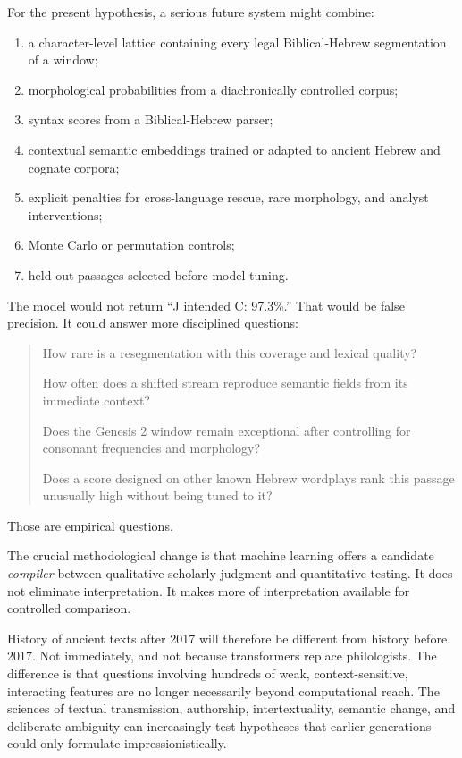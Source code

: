 For the present hypothesis, a serious future system might combine:

\begin{enumerate}
\item a character-level lattice containing every legal Biblical-Hebrew segmentation of a window;
\item morphological probabilities from a diachronically controlled corpus;
\item syntax scores from a Biblical-Hebrew parser;
\item contextual semantic embeddings trained or adapted to ancient Hebrew and cognate corpora;
\item explicit penalties for cross-language rescue, rare morphology, and analyst interventions;
\item Monte Carlo or permutation controls;
\item held-out passages selected before model tuning.
\end{enumerate}

The model would not return ``J intended C: 97.3\%.''  That would be false precision.  It could answer more disciplined questions:

\begin{quote}
How rare is a resegmentation with this coverage and lexical quality?

How often does a shifted stream reproduce semantic fields from its immediate context?

Does the Genesis 2 window remain exceptional after controlling for consonant frequencies and morphology?

Does a score designed on other known Hebrew wordplays rank this passage unusually high without being tuned to it?
\end{quote}

Those are empirical questions.

The crucial methodological change is that machine learning offers a candidate \emph{compiler} between qualitative scholarly judgment and quantitative testing.  It does not eliminate interpretation.  It makes more of interpretation available for controlled comparison.

History of ancient texts after 2017 will therefore be different from history before 2017.  Not immediately, and not because transformers replace philologists.  The difference is that questions involving hundreds of weak, context-sensitive, interacting features are no longer necessarily beyond computational reach.  The sciences of textual transmission, authorship, intertextuality, semantic change, and deliberate ambiguity can increasingly test hypotheses that earlier generations could only formulate impressionistically.

